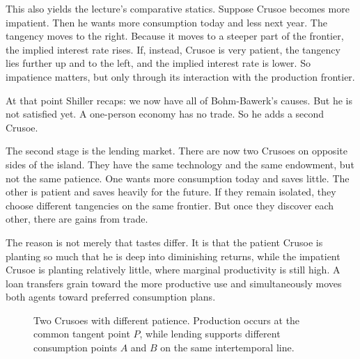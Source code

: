This also yields the lecture's comparative statics. Suppose Crusoe becomes more impatient. Then he wants more consumption today and less next year. The tangency moves to the right. Because it moves to a steeper part of the frontier, the implied interest rate rises. If, instead, Crusoe is very patient, the tangency lies further up and to the left, and the implied interest rate is lower. So impatience matters, but only through its interaction with the production frontier.

At that point Shiller recaps: we now have all of Bohm-Bawerk's causes. But he is not satisfied yet. A one-person economy has no trade. So he adds a second Crusoe.

The second stage is the lending market. There are now two Crusoes on opposite sides of the island. They have the same technology and the same endowment, but not the same patience. One wants more consumption today and saves little. The other is patient and saves heavily for the future. If they remain isolated, they choose different tangencies on the same frontier. But once they discover each other, there are gains from trade.

The reason is not merely that tastes differ. It is that the patient Crusoe is planting so much that he is deep into diminishing returns, while the impatient Crusoe is planting relatively little, where marginal productivity is still high. A loan transfers grain toward the more productive use and simultaneously moves both agents toward preferred consumption plans.

\begin{figure}[t]
\centering
{}
\caption{Two Crusoes with different patience. Production occurs at the common tangent point \(P\), while lending supports different consumption points \(A\) and \(B\) on the same intertemporal line.}
\end{figure}

